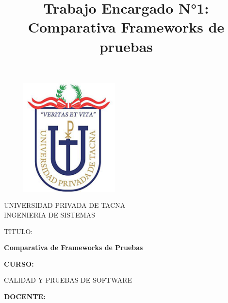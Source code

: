 \documentclass{article}
\begin{document}
\title{Trabajo Encargado N°1: Comparativa Frameworks de pruebas}

\begin{titlepage}
\begin{figure}[htb]
\begin{center}
\includegraphics[width=5cm]{logo.png}
\end{center}
\end{figure}
\vspace*{-0.25in}
\begin{center}
\large{UNIVERSIDAD PRIVADA DE TACNA}\\
\vspace*{-0.025in}
INGENIERIA DE SISTEMAS  \\

\vspace*{0.5in}
\begin{large}
TITULO:\\
\end{large}

\vspace*{0.1in}
\begin{Large}
\textbf{Comparativa de Frameworks de Pruebas} \\
\end{Large}

\vspace*{0.3in}
\begin{Large}
\textbf{CURSO:} \\
\end{Large}

\vspace*{0.1in}
\begin{large}
CALIDAD Y PRUEBAS DE SOFTWARE\\
\end{large}

\vspace*{0.3in}
\begin{Large}
\textbf{DOCENTE:} \\
\end{Large}


\end{center}
\end{titlepage}
\end{document}
